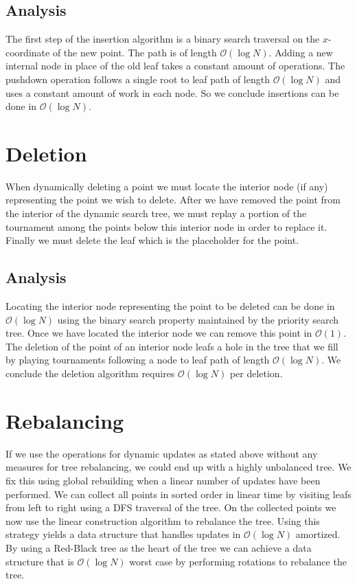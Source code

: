 \documentclass[twoside,11pt,openright]{report}
\begin{document}
\subsection*{Analysis}

The first step of the insertion algorithm is a binary search traversal on the $x$-coordinate of the new point. The path is of length $\mathcal{O}(\log N)$. Adding a new internal node in place of the old leaf takes a constant amount of operations. The pushdown operation follows a single root to leaf path of length $\mathcal{O}(\log N)$ and uses a constant amount of work in each node. So we conclude insertions can be done in $\mathcal{O}(\log N)$.

\section{Deletion}

When dynamically deleting a point we must locate the interior node (if any) representing the point we wish to delete. After we have removed the point from the interior of the dynamic search tree, we must replay a portion of the tournament among the points below this interior node in order to replace it. Finally we must delete the leaf which is the placeholder for the point.

\subsection*{Analysis}
Locating the interior node representing the point to be deleted can be done in $\mathcal{O}(\log N)$ using the binary search property maintained by the priority search tree. Once we have located the interior node we can remove this point in $\mathcal{O}(1)$. The deletion of the point of an interior node leafs a hole in the tree that we fill by playing tournaments following a node to leaf path of length $\mathcal{O}(\log N)$. We conclude the deletion algorithm requires $\mathcal{O}(\log N)$ per deletion.


\section{Rebalancing}
If we use the operations for dynamic updates as stated above without any measures for tree rebalancing, we could end up with a highly unbalanced tree. We fix this using global rebuilding when a linear number of updates have been performed. We can collect all points in sorted order in linear time by visiting leafs from left to right using a DFS traversal of the tree. On the collected points we now use the linear construction algorithm to rebalance the tree. Using this strategy yields a data structure that handles updates in $\mathcal{O}(\log N)$ amortized. By using a Red-Black tree as the heart of the tree we can achieve a data structure that is $\mathcal{O}(\log N)$ worst case by performing rotations to rebalance the tree.
\end{document}
